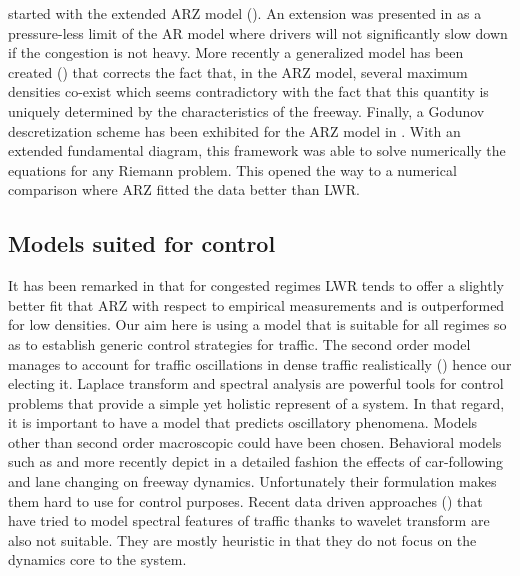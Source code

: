 \documentclass[preprint]{elsarticle}
\begin{document}
started with the extended ARZ model (\cite{lebacque2007generic}).
An extension was presented in \cite{berthelin2008model} as a pressure-less
limit of the AR model where drivers will not significantly slow down
if the congestion is not heavy. More recently a generalized model
has been created (\cite{Fan}) that corrects the fact that, in the
ARZ model, several maximum densities co-exist which seems contradictory
with the fact that this quantity is uniquely determined by the characteristics
of the freeway. Finally, a Godunov descretization scheme has been
exhibited for the ARZ model in \cite{GodunovARZ}. With an extended
fundamental diagram, this framework was able to solve numerically the equations
for any Riemann problem. This opened the way to a numerical comparison
where ARZ fitted the data better than LWR.

\subsection{Models suited for control}
It has been remarked in \cite{Fan} that for congested regimes
LWR tends to offer a slightly better fit that ARZ with respect to empirical
measurements and is outperformed for low densities. Our aim here is
using a model that is suitable for all regimes so as to establish
generic control strategies for traffic. The second order model
manages to account for traffic oscillations in dense traffic
realistically (\cite{Greenberg_congestionredux}) hence our electing it. Laplace transform
and spectral analysis are powerful tools for control problems that
provide a simple yet holistic represent of a system. In that regard,
it is important to have a model that predicts oscillatory
phenomena. Models other than second order macroscopic could have been
chosen. Behavioral models such as \cite{Newel} and more recently
\cite{Chen2012} depict in a detailed fashion the effects of car-following
and lane changing on freeway dynamics. Unfortunately their formulation
makes them hard to use for control purposes. Recent data driven approaches
(\cite{Zheng2011}) that have tried to model spectral features of
traffic thanks to wavelet transform are also not suitable. They are
mostly heuristic in that they do not focus on the dynamics core to the system.
\end{document}
